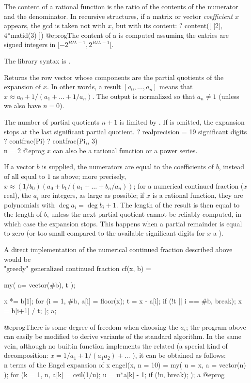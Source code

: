 The content of a rational function is the ratio of the contents of the
numerator and the denominator. In recursive structures, if a
matrix or vector \emph{coefficient} $x$ appears, the gcd is taken
not with $x$, but with its content:
\bprog
? content([ [2], 4*matid(3) ])
@eprog\noindent The content of a  is computed assuming the
entries are signed integers in $[-2^{BIL-1}, 2^{BIL-1}[$.

The library syntax is .

\label{se:contfrac}
Returns the row vector whose components are the partial quotients of the
 expansion of $x$. In other words, a result
$[a_0,\dots,a_n]$ means that $x \approx a_0+1/(a_1+\dots+1/a_n)$. The
output is normalized so that $a_n \neq 1$ (unless we also have $n = 0$).

The number of partial quotients $n+1$ is limited by . If
 is omitted, the expansion stops at the last significant partial
quotient.
\bprog
? 
  realprecision = 19 significant digits
? contfrac(Pi)
? contfrac(Pi,, 3)  \\ n = 2
@eprog\noindent
$x$ can also be a rational function or a power series.

If a vector $b$ is supplied, the numerators are equal to the coefficients
of $b$, instead of all equal to $1$ as above; more precisely, $x \approx
(1/b_0)(a_0+b_1/(a_1+\dots+b_n/a_n))$; for a numerical continued fraction
($x$ real), the $a_i$ are integers, as large as possible; if $x$ is a
rational function, they are polynomials with $\deg a_i = \deg b_i + 1$.
The length of the result is then equal to the length of $b$, unless the next
partial quotient cannot be reliably computed, in which case the expansion
stops. This happens when a partial remainder is equal to zero (or too small
compared to the available significant digits for $x$ a ).

A direct implementation of the numerical continued fraction
 described above would be
\bprog
\\ "greedy" generalized continued fraction
cf(x, b) =
{ my( a= vector(#b), t );

  x *= b[1];
  for (i = 1, #b,
    a[i] = floor(x);
    t = x - a[i]; if (!t || i == #b, break);
    x = b[i+1] / t;
  ); a;
}
@eprog\noindent There is some degree of freedom when choosing the $a_i$; the
program above can easily be modified to derive variants of the standard
algorithm. In the same vein, although no builtin
function implements the related  (a special kind of
 decomposition: $x = 1/a_1 + 1/(a_1a_2) + \dots$ ),
it can be obtained as follows:
\bprog
\\ n terms of the Engel expansion of x
engel(x, n = 10) =
{ my( u = x, a = vector(n) );
  for (k = 1, n,
    a[k] = ceil(1/u);
    u = u*a[k] - 1;
    if (!u, break);
  ); a
}
@eprog

